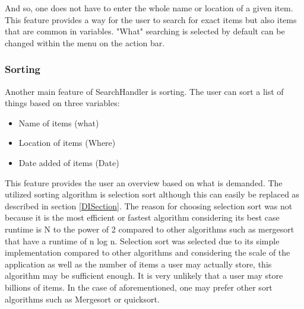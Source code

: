 \documentclass{article}
\begin{document}
And so, one does not have to enter the whole name or location of a given item. This feature provides a way for the user to search for exact items but also items that are common in variables. "What" searching is selected by default can be changed within the menu on the action bar.

\subsubsection{Sorting}Another main feature of SearchHandler is sorting. The user can sort a list of things based on three variables:

\begin{itemize}
	\item Name of items (what)
	\item Location of items (Where)
	\item Date added of items (Date)
\end{itemize}

This feature provides the user an overview based on what is demanded. The utilized sorting algorithm is selection sort although this can easily be replaced as described in section \ref{DISection}. The reason for choosing selection sort was not because it is the most efficient or fastest algorithm considering its best case runtime is N to the power of 2 compared to other algorithms such as mergesort that have a runtime of n log n. Selection sort was selected due to its simple implementation compared to other algorithms and considering the scale of the application as well as the number of items a user may actually store, this algorithm may be sufficient enough. It is very unlikely that a user may store billions of items. In the case of aforementioned, one may prefer other sort algorithms such as Mergesort or quicksort. 
\end{document}

